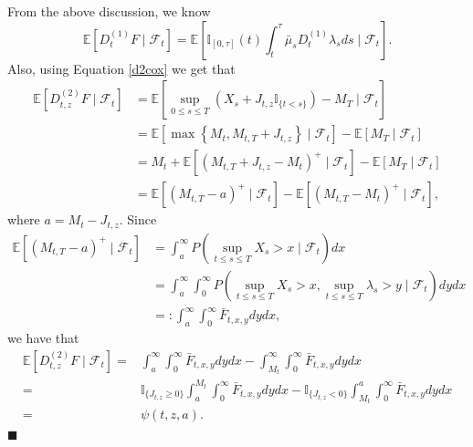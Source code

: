 \documentclass[11pt]{article}
\numberwithin{equation}{section}
\newenvironment{Proof}{\noindent{\bf Proof.}}{\hfill{$\blacksquare$}}
\begin{document}
\begin{Proof}
From the above discussion, we know 
$$
\mathbb{E}\left[D_{t}^{(1)} F \mid \mathcal{F}_{t}\right]= \mathbb{E}\left[\mathbb{I}_{[0, \tau]}(t)\int_t^\tau \bar{\mu}_s D_t^{(1)}\lambda_s ds\mid \mathcal{F}_{t}\right].
$$
Also, using Equation \eqref{d2cox} we get that
\begin{align*}
\mathbb{E}\left[D_{t, z}^{(2)} F \mid \mathcal{F}_{t}\right] & =\mathbb{E}\left[\sup _{0 \leq s \leq T}\left(X_{s}+J_{t,z} \mathbb{I}_{\{t<s\}}\right)-M_{T} \mid \mathcal{F}_{t}\right] \\
& =\mathbb{E}\left[\max \left\{M_{t}, M_{t, T}+J_{t,z}\right\} \mid \mathcal{F}_{t}\right]-\mathbb{E}\left[M_{T} \mid \mathcal{F}_{t}\right] \\
& =M_{t}+\mathbb{E}\left[\left(M_{t, T}+J_{t,z}-M_{t}\right)^{+} \mid \mathcal{F}_{t}\right]-\mathbb{E}\left[M_{T} \mid \mathcal{F}_{t}\right] \\
& =\mathbb{E}\left[\left(M_{t, T}-a\right)^{+} \mid \mathcal{F}_{t}\right]-\mathbb{E}\left[(M_{t, T} - M_t )^{+} \mid \mathcal{F}_{t}\right],
\end{align*}
where $a=M_{t}-J_{t,z}$. Since 
\begin{align*}
\mathbb{E}\left[\left(M_{t, T}-a\right)^{+} \mid \mathcal{F}_{t}\right]  &=\int_{a}^{\infty}  P(\sup_{t \leq s \leq T}X_s > x \mid  \mathcal{F}_{t})d x\\
& =\int_{a}^{\infty} \int_{0}^{\infty}  P(\sup_{t \leq s \leq T}X_s > x , \sup_{t \le s \le T}\lambda_s > y \mid  \mathcal{F}_{t})dy d x\\
&=: \int_{a}^{\infty}\int_{0}^{\infty} \bar{F}_{t, x, y}dy d x,
\end{align*}
we have that
\begin{align*}
\mathbb{E}\left[D_{t, z}^{(2)} F \mid \mathcal{F}_{t}\right] = & \int_{a}^{\infty}\int_{0}^{\infty} \bar{F}_{t, x, y}dy d x- \int_{M_t}^{\infty}\int_{0}^{\infty} \bar{F}_{t, x, y}dy d x\\
= & \mathbb{I}_{\{J_{t,z} \geq 0\}}\int_{a}^{M_t} \int_{0}^{\infty}\bar{F}_{t, x, y}dy d x -  \mathbb{I}_{\{J_{t,z} < 0\}}\int_{M_t}^{a} \int_{0}^{\infty}\bar{F}_{t, x, y}dy d x\\
=& \psi(t, z, a).
\end{align*}
\end{Proof}
\end{document}
